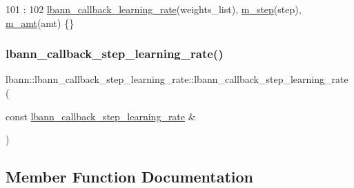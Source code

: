 \begin{DoxyCode}
101                                                                  :
102   \hyperlink{classlbann_1_1lbann__callback__learning__rate_a69687cd55f4d09c480e08e18488519fe}{lbann\_callback\_learning\_rate}(weights\_list), \hyperlink{classlbann_1_1lbann__callback__step__learning__rate_a804bffdc6bcc1e1f43dc068db852b993}{m\_step}(step), 
      \hyperlink{classlbann_1_1lbann__callback__step__learning__rate_ab6f5430cf862ec67392dc0f69ced81e6}{m\_amt}(amt) \{\}
\end{DoxyCode}
\mbox{\label{classlbann_1_1lbann__callback__step__learning__rate_a490e371559547d9527a4dee80dabed03}} 
\subsubsection{\texorpdfstring{lbann\+\_\+callback\+\_\+step\+\_\+learning\+\_\+rate()}{lbann\_callback\_step\_learning\_rate()}\hspace{0.1cm}{\footnotesize\ttfamily [3/3]}}
{\footnotesize\ttfamily lbann\+::lbann\+\_\+callback\+\_\+step\+\_\+learning\+\_\+rate\+::lbann\+\_\+callback\+\_\+step\+\_\+learning\+\_\+rate (\begin{DoxyParamCaption}\item[{const \hyperlink{classlbann_1_1lbann__callback__step__learning__rate}{lbann\+\_\+callback\+\_\+step\+\_\+learning\+\_\+rate} \&}]{ }\end{DoxyParamCaption})\hspace{0.3cm}{\ttfamily [default]}}



\subsection{Member Function Documentation}
\mbox{\label{classlbann_1_1lbann__callback__step__learning__rate_aa4848d45df5b6ab58456374ce966b374}} 
